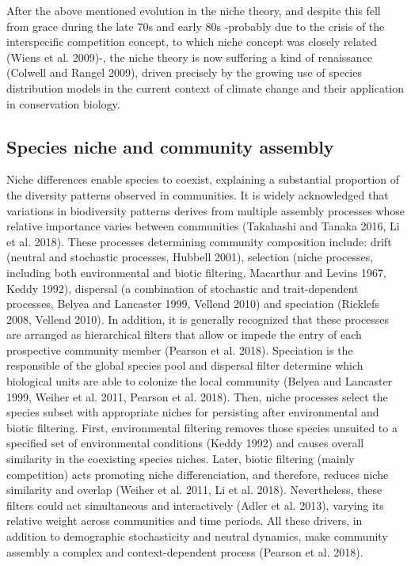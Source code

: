 \documentclass[11pt,twoside]{reedthesis}
\begin{document}
After the above mentioned evolution in the niche theory, and despite
this fell from grace during the late 70s and early 80s -probably due to
the crisis of the interspecific competition concept, to which niche
concept was closely related (Wiens et al. 2009)-, the niche theory is
now suffering a kind of renaissance (Colwell and Rangel 2009), driven
precisely by the growing use of species distribution models in the
current context of climate change and their application in conservation
biology.\par

\subsection{Species niche and community
assembly}\label{species-niche-and-community-assembly}

\par

Niche differences enable species to coexist, explaining a substantial
proportion of the diversity patterns observed in communities. It is
widely acknowledged that variations in biodiversity patterns derives
from multiple assembly processes whose relative importance varies
between communities (Takahashi and Tanaka 2016, Li et al. 2018). These
processes determining community composition include: drift (neutral and
stochastic processes, Hubbell 2001), selection (niche processes,
including both environmental and biotic filtering, Macarthur and Levins
1967, Keddy 1992), dispersal (a combination of stochastic and
trait-dependent processes, Belyea and Lancaster 1999, Vellend 2010) and
speciation (Ricklefs 2008, Vellend 2010). In addition, it is generally
recognized that these processes are arranged as hierarchical filters
that allow or impede the entry of each prospective community member
(Pearson et al. 2018). Speciation is the responsible of the global
species pool and dispersal filter determine which biological units are
able to colonize the local community (Belyea and Lancaster 1999, Weiher
et al. 2011, Pearson et al. 2018). Then, niche processes select the
species subset with appropriate niches for persisting after
environmental and biotic filtering. First, environmental filtering
removes those species unsuited to a specified set of environmental
conditions (Keddy 1992) and causes overall similarity in the coexisting
species niches. Later, biotic filtering (mainly competition) acts
promoting niche differenciation, and therefore, reduces niche similarity
and overlap (Weiher et al. 2011, Li et al. 2018). Nevertheless, these
filters could act simultaneous and interactively (Adler et al. 2013),
varying its relative weight across communities and time periods. All
these drivers, in addition to demographic stochasticity and neutral
dynamics, make community assembly a complex and context-dependent
process (Pearson et al. 2018).\par
\end{document}
